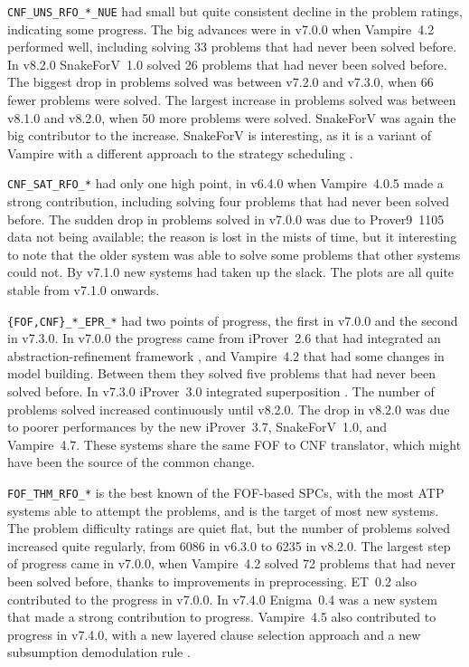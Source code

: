 \documentclass[runningheads]{llncs}
\begin{document}
{\tt CNF\_UNS\_RFO\_*\_NUE} had small but quite consistent decline in the problem ratings, 
indicating some progress.
The big advances were in v7.0.0 when Vampire~4.2 performed well, including solving 33 problems
that had never been solved before.
In v8.2.0 SnakeForV~1.0 solved 26 problems that had never been solved before.
The biggest drop in problems solved was between v7.2.0 and v7.3.0, when 66 fewer problems were
solved.
The largest increase in problems solved was between v8.1.0 and v8.2.0, when 50 more problems
were solved.
SnakeForV was again the big contributor to the increase.
SnakeForV is interesting, as it is a variant of Vampire with a different approach to the strategy
scheduling \cite{Sud22}.

{\tt CNF\_SAT\_RFO\_*} had only one high point, in v6.4.0 when Vampire~4.0.5 made a strong
contribution, including solving four problems that had never been solved before.
The sudden drop in problems solved in v7.0.0 was due to Prover9~1105 \cite{McC-Prover9-URL}
data not being available; the reason is lost in the mists of time, but it interesting to note 
that the older system was able to solve some problems that other systems could not.
By v7.1.0 new systems had taken up the slack.
The plots are all quite stable from v7.1.0 onwards.

{\tt \{FOF,CNF\}\_*\_EPR\_*} had two points of progress, the first in v7.0.0 and the second in
v7.3.0.
In v7.0.0 the progress came from iProver~2.6 that had integrated an abstraction-refinement 
framework \cite{HK17}, and Vampire~4.2 that had some changes in model building.
Between them they solved five problems that had never been solved before.
In v7.3.0 iProver~3.0 integrated superposition \cite{DK20}.
The number of problems solved increased continuously until v8.2.0. 
The drop in v8.2.0 
was due to poorer performances by the new iProver~3.7, SnakeForV~1.0, and Vampire~4.7.
These systems share the same FOF to CNF translator, which might have been the source of the
common change.

{\tt FOF\_THM\_RFO\_*} is the best known of the FOF-based SPCs, with the most ATP systems able 
to attempt the problems, and is the target of most new systems.
The problem difficulty ratings are quiet flat, but the number of problems solved increased quite 
regularly, from 6086 in v6.3.0 to 6235 in v8.2.0.
The largest step of progress came in v7.0.0, when Vampire~4.2 solved 72 problems that had never 
been solved before, thanks to improvements in preprocessing.
ET~0.2 \cite{KS+15} also contributed to the progress in v7.0.0.
In v7.4.0 Enigma~0.4 \cite{JU17,JC+20} was a new system that made a strong contribution to 
progress.
Vampire~4.5 also contributed to progress in v7.4.0, with a new layered clause selection approach 
\cite{GS20} and a new subsumption demodulation rule \cite{GKR20}.
\end{document}
